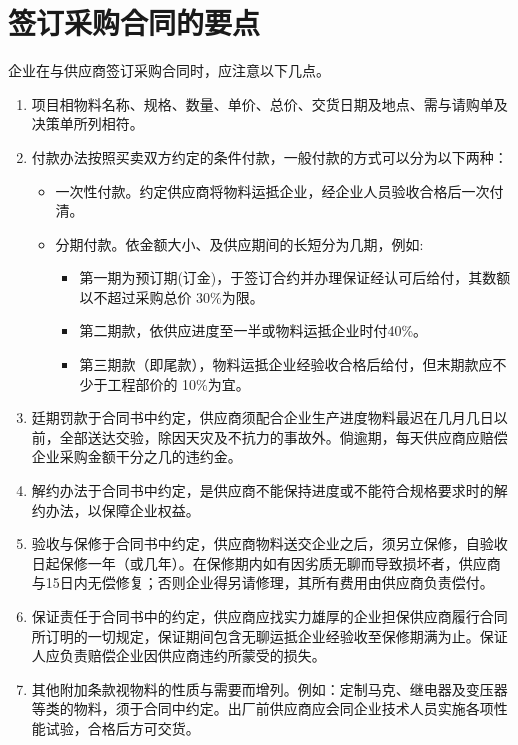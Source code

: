 \section {签订采购合同的要点}

    企业在与供应商签订采购合同时，应注意以下几点。

    \begin{enumerate}

        \item 项目相物料名称、规格、数量、单价、总价、交货日期及地点、需与请购单及决策单所列相符。

        \item 付款办法按照买卖双方约定的条件付款，一般付款的方式可以分为以下两种：
            \begin{itemize}
                \item  一次性付款。约定供应商将物料运抵企业，经企业人员验收合格后一次付清。
                \item  分期付款。依金额大小、及供应期间的长短分为几期，例如:
                    \begin{itemize}
                        \item  第一期为预订期(订金)，于签订合约并办理保证经认可后给付，其数额以不超过采购总价 30\%为限。
                        \item 第二期款，依供应进度至一半或物料运抵企业时付40\%。
                        \item 第三期款（即尾款），物料运抵企业经验收合格后给付，但末期款应不少于工程部价的 10\%为宜。
                \end{itemize}
            \end{itemize}
        \item 廷期罚款于合同书中约定，供应商须配合企业生产进度物料最迟在几月几日以前，全部送达交验，除因天灾及不抗力的事故外。倘逾期，每天供应商应赔偿企业采购金额干分之几的违约金。

        \item 解约办法于合同书中约定，是供应商不能保持进度或不能符合规格要求时的解约办法，以保障企业权益。

        \item 验收与保修于合同书中约定，供应商物料送交企业之后，须另立保修，自验收日起保修一年（或几年）。在保修期内如有因劣质无聊而导致损坏者，供应商与15日内无偿修复；否则企业得另请修理，其所有费用由供应商负责偿付。

        \item 保证责任于合同书中的约定，供应商应找实力雄厚的企业担保供应商履行合同所订明的一切规定，保证期间包含无聊运抵企业经验收至保修期满为止。保证人应负责赔偿企业因供应商违约所蒙受的损失。

        \item 其他附加条款视物料的性质与需要而增列。例如：定制马克、继电器及变压器等类的物料，须于合同中约定。出厂前供应商应会同企业技术人员实施各项性能试验，合格后方可交货。
    \end{enumerate}
